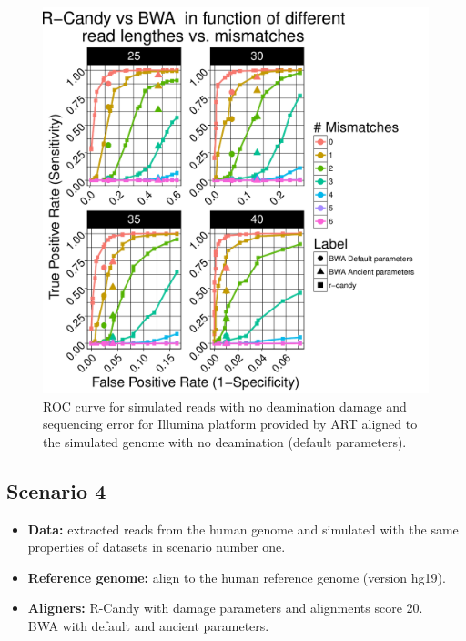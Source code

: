 \documentclass[11pt,a4paper]{report}
\begin{document}
\begin{figure}[H]
\centering
\includegraphics[width=12cm]{pictures/bROC_DS3_ART.pdf}
\caption{ROC curve for simulated reads with no deamination damage and sequencing error for Illumina platform provided by ART aligned to the simulated genome
         with no deamination (default parameters).}
\label{DS3_ART}
\end{figure}


\subsection{Scenario 4}
 
  \begin{itemize}

   \item \textbf{Data:} extracted reads from the human genome and simulated 
with the same properties of datasets in scenario number one.
   
   \item \textbf{Reference genome:} align to the human reference genome (version hg19).
   
    \item \textbf{Aligners:} R-Candy with damage parameters and alignments score 20. \\
BWA with default and ancient parameters.
  \end{itemize}
 
\end{document}

